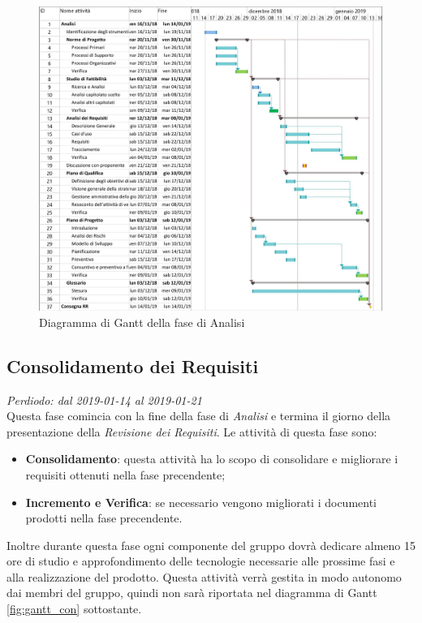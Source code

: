 \begin{figure}[H]
	\includegraphics[scale=0.8]{res/images/gantt_analisi.jpg}
	\caption{Diagramma di Gantt della fase di Analisi}
\end{figure}



\subsection{Consolidamento dei Requisiti}
\textit{Perdiodo: dal 2019-01-14 al 2019-01-21} \\
Questa fase comincia con la fine della fase di \textit{Analisi} e termina il giorno della presentazione della \textit{Revisione dei Requisiti}. Le attività di questa fase sono:
\begin{itemize}
	\item \textbf{Consolidamento}: questa attività ha lo scopo di consolidare e migliorare i requisiti ottenuti nella fase precendente;
	\item \textbf{Incremento e Verifica}: se necessario vengono migliorati i documenti prodotti nella fase precendente.
\end{itemize}
Inoltre durante questa fase ogni componente del gruppo dovrà dedicare almeno 15 
ore di studio e approfondimento delle tecnologie necessarie alle prossime fasi 
e alla realizzazione del prodotto. Questa attività verrà gestita in modo 
autonomo dai membri del gruppo, quindi non sarà riportata nel diagramma di 
Gantt \ref{fig:gantt_con} sottostante.

